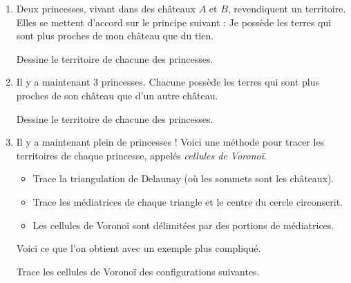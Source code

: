 \documentclass[class=report,crop=false, 12pt]{standalone}
\begin{document}
\begin{activite}

\sauteligne

\begin{enumerate}
  \item Deux princesses, vivant dans des châteaux $A$ et $B$, revendiquent un territoire. Elles se mettent d'accord sur le principe suivant : \og Je possède les terres qui sont plus proches de mon château que du tien. \fg{}

Dessine le territoire de chacune des princesses.

  \item Il y a maintenant $3$ princesses. Chacune possède les terres qui sont plus proches de son château que d'un autre château.
  

Dessine le territoire de chacune des princesses.
  
  \item Il y a maintenant plein de princesses !
  Voici une méthode pour tracer les territoires de chaque princesse, appelés \emph{cellules de Voronoï}. 
  \begin{itemize}
    \item Trace la triangulation de Delaunay (où les sommets sont les châteaux).
    \item Trace les médiatrices de chaque triangle et le centre du cercle circonscrit.
    \item Les cellules de Voronoï sont délimitées par des portions de médiatrices.
  \end{itemize}

 
 
  
Voici ce que l'on obtient avec un exemple plus compliqué.
  
Trace les cellules de Voronoï des configurations suivantes.

  
  
 
 
\end{enumerate}

\end{activite}
\end{document}
